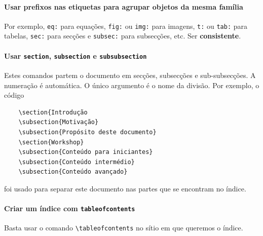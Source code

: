 \documentclass[11pt]{article}
\begin{document}
\paragraph{Usar prefixos nas etiquetas para agrupar objetos da mesma família}
Por exemplo, \texttt{eq:} para equações, \texttt{fig:} ou \texttt{img:} para imagens,
\texttt{t:} ou \texttt{tab:} para tabelas, \texttt{sec:} para secções
e \texttt{subsec:} para subsecções, etc. Ser \textbf{consistente}.

\paragraph{Usar \texttt{section}, \texttt{subsection} e \texttt{subsubsection}}
Estes comandos partem o documento em secções, subsecções e sub-subsecções.
A numeração é automática. O único argumento é o nome da divisão. Por exemplo, o
código
\begin{verbatim}
    \section{Introdução
    \subsection{Motivação}
    \subsection{Propósito deste documento}
    \section{Workshop}
    \subsection{Conteúdo para iniciantes}
    \subsection{Conteúdo intermédio}
    \subsection{Conteúdo avançado}
\end{verbatim}
foi usado para separar este documento nas partes que se encontram no índice.

\paragraph{Criar um índice com \texttt{tableofcontents}}
Basta usar o comando \verb|\tableofcontents| no sítio em que queremos o índice.
\end{document}
